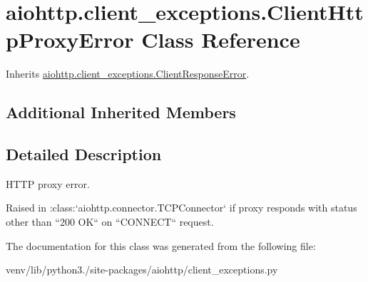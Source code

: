 \hypertarget{classaiohttp_1_1client__exceptions_1_1_client_http_proxy_error}{}\section{aiohttp.\+client\+\_\+exceptions.\+Client\+Http\+Proxy\+Error Class Reference}
\label{classaiohttp_1_1client__exceptions_1_1_client_http_proxy_error}


Inherits \hyperlink{classaiohttp_1_1client__exceptions_1_1_client_response_error}{aiohttp.\+client\+\_\+exceptions.\+Client\+Response\+Error}.

\subsection*{Additional Inherited Members}


\subsection{Detailed Description}
\begin{DoxyVerb}HTTP proxy error.

Raised in :class:`aiohttp.connector.TCPConnector` if
proxy responds with status other than ``200 OK``
on ``CONNECT`` request.
\end{DoxyVerb}
 

The documentation for this class was generated from the following file\+:\begin{DoxyCompactItemize}
\item 
venv/lib/python3./site-\/packages/aiohttp/client\+\_\+exceptions.\+py\end{DoxyCompactItemize}
